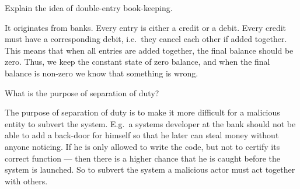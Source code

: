 \question[3]\label{q:accountability}
Explain the idea of double-entry book-keeping.

\begin{solution}
  It originates from banks.
  Every entry is either a credit or a debit.
  Every credit must have a corresponding debit, i.e.\ they cancel each other if 
  added together.
  This means that when all entries are added together, the final balance should 
  be zero.
  Thus, we keep the constant state of zero balance, and when the final balance 
  is non-zero we know that something is wrong.
\end{solution}


\question\label{q:accountability}


\question[3]\label{q:accountability}
What is the purpose of separation of duty?

\begin{solution}
  The purpose of separation of duty is to make it more difficult for 
  a malicious entity to subvert the system.
  E.g.\ a systems developer at the bank should not be able to add a back-door 
  for himself so that he later can steal money without anyone noticing.
  If he is only allowed to write the code, but not to certify its correct 
  function --- then there is a higher chance that he is caught before the 
  system is launched.
  So to subvert the system a malicious actor must act together with others.
\end{solution}


